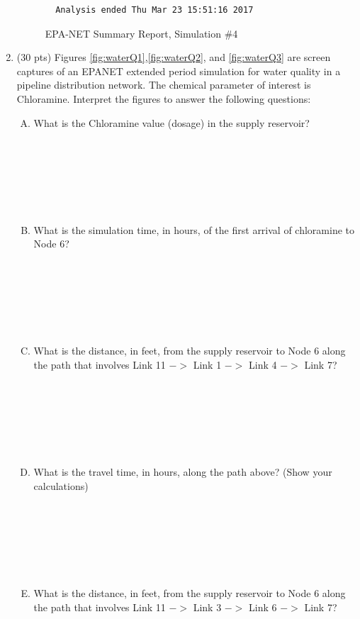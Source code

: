 \documentclass[11pt]{article}
\begin{document}
\begin{enumerate}
\begin{figure}[ht!]
\begin{verbatim}
  Analysis ended Thu Mar 23 15:51:16 2017  \end{verbatim}
     \caption{EPA-NET Summary Report, Simulation \#4}
   \label{fig:epanet4} 
\end{figure}
\clearpage
\item (30 pts) Figures \ref{fig:waterQ1},\ref{fig:waterQ2}, and \ref{fig:waterQ3} are screen captures of an EPANET extended period simulation for water quality in a pipeline distribution network.
The chemical parameter of interest is Chloramine.  Interpret the figures to answer the following questions: ~\\
\begin{enumerate}[A)]
\item What is the Chloramine value (dosage) in the supply reservoir? \\~\\~\\~\\~\\~\\~\\
\item What is the simulation time, in hours, of the first arrival of chloramine to Node 6? \\~\\~\\~\\~\\~\\~\\
\item What is the distance, in feet, from the supply reservoir to Node 6 along the path that involves Link 11 $->$ Link 1 $->$ Link 4 $->$ Link 7? \\~\\~\\~\\~\\~\\~\\
\item What is the travel time, in hours, along the path above? (Show your calculations) \\~\\~\\~\\~\\~\\~\\
\newpage
\item What is the distance, in feet, from the supply reservoir to Node 6 along the path that involves Link 11 $->$ Link 3 $->$ Link 6 $->$ Link 7? \\~\\~\\~\\~\\~\\~\\

\end{enumerate}
\end{enumerate}
\end{document}
